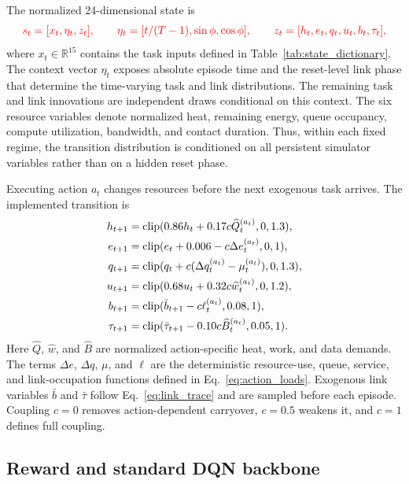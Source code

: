 \documentclass[11pt]{article}
\newcommand{\R}{\mathbb{R}}
\DeclareMathOperator{\clip}{clip}
\begin{document}
\color{red}%
The normalized 24-dimensional state is
\color{black}%
\begin{equation}
\color{red}%
s_t=[x_t,\eta_t,z_t],\qquad
\eta_t=[t/(T-1),\sin\phi,\cos\phi],\qquad
z_t=[h_t,e_t,q_t,u_t,b_t,\tau_t],
\color{black}%
\end{equation}
\color{red}%
where $x_t\in\R^{15}$ contains the task inputs defined in Table~\ref{tab:state_dictionary}. The context vector $\eta_t$ exposes absolute episode time and the reset-level link phase that determine the time-varying task and link distributions. The remaining task and link innovations are independent draws conditional on this context. The six resource variables denote normalized heat, remaining energy, queue occupancy, compute utilization, bandwidth, and contact duration. Thus, within each fixed regime, the transition distribution is conditioned on all persistent simulator variables rather than on a hidden reset phase.
\color{black}%

Executing action $a_t$ changes resources before the next exogenous task arrives. The implemented transition is
\begin{align}
h_{t+1}&=\clip(0.86h_t+0.17c\widehat Q_t^{(a_t)},0,1.3),\notag\\
e_{t+1}&=\clip(e_t+0.006-c\Delta e_t^{(a_t)},0,1),\notag\\
q_{t+1}&=\clip(q_t+c(\Delta q_t^{(a_t)}-\mu_t^{(a_t)}),0,1.3),\notag\\
u_{t+1}&=\clip(0.68u_t+0.32c\widehat w_t^{(a_t)},0,1.2),\notag\\
b_{t+1}&=\clip(\bar b_{t+1}-c\ell_t^{(a_t)},0.08,1),\notag\\
\tau_{t+1}&=\clip(\bar\tau_{t+1}-0.10c\widehat B_t^{(a_t)},0.05,1).
\label{eq:transition}
\end{align}
Here $\widehat Q$, $\widehat w$, and $\widehat B$ are normalized action-specific heat, work, and data demands. The terms $\Delta e$, $\Delta q$, $\mu$, and $\ell$ are the deterministic resource-use, queue, service, and link-occupation functions defined in Eq.~\eqref{eq:action_loads}. Exogenous link variables $\bar b$ and $\bar\tau$ follow Eq.~\eqref{eq:link_trace} and are sampled before each episode. Coupling $c=0$ removes action-dependent carryover, $c=0.5$ weakens it, and $c=1$ defines full coupling.

\subsection{Reward and standard DQN backbone}
\end{document}
